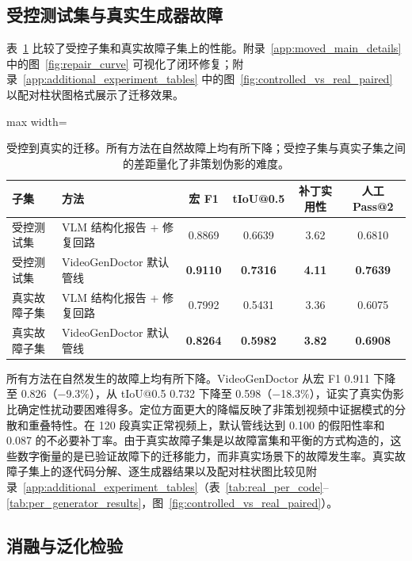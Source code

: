 \documentclass{article}
\begin{document}
\subsection{受控测试集与真实生成器故障}
\label{sec:real_failures}
表~\ref{tab:controlled_vs_real} 比较了受控子集和真实故障子集上的性能。附录~\ref{app:moved_main_details} 中的图~\ref{fig:repair_curve} 可视化了闭环修复；附录~\ref{app:additional_experiment_tables} 中的图~\ref{fig:controlled_vs_real_paired} 以配对柱状图格式展示了迁移效果。
\begin{table}[t]
\centering\small
\caption{受控到真实的迁移。所有方法在自然故障上均有所下降；受控子集与真实子集之间的差距量化了非策划伪影的难度。}
\label{tab:controlled_vs_real}
\begin{adjustbox}{max width=\textwidth}
\begin{tabular}{llcccc}
\toprule
\textbf{子集} & \textbf{方法} & \textbf{宏 F1} & \textbf{tIoU@0.5} & \textbf{补丁实用性} & \textbf{人工 Pass@2} \\
\midrule
受控测试集 & VLM 结构化报告 + 修复回路 & 0.8869 & 0.6639 & 3.62 & 0.6810 \\
受控测试集 & VideoGenDoctor 默认管线 & \textbf{0.9110} & \textbf{0.7316} & \textbf{4.11} & \textbf{0.7639} \\
真实故障子集 & VLM 结构化报告 + 修复回路 & 0.7992 & 0.5431 & 3.36 & 0.6075 \\
真实故障子集 & VideoGenDoctor 默认管线 & \textbf{0.8264} & \textbf{0.5982} & \textbf{3.82} & \textbf{0.6908} \\
\bottomrule
\end{tabular}
\end{adjustbox}
\end{table}

所有方法在自然发生的故障上均有所下降。VideoGenDoctor 从宏 F1 0.911 下降至 0.826（$-$9.3\%），从 tIoU@0.5 0.732 下降至 0.598（$-$18.3\%），证实了真实伪影比确定性扰动要困难得多。定位方面更大的降幅反映了非策划视频中证据模式的分散和重叠特性。在 120 段真实正常视频上，默认管线达到 0.100 的假阳性率和 0.087 的不必要补丁率。由于真实故障子集是以故障富集和平衡的方式构造的，这些数字衡量的是已验证故障下的迁移能力，而非真实场景下的故障发生率。真实故障子集上的逐代码分解、逐生成器结果以及配对柱状图比较见附录~\ref{app:additional_experiment_tables}（表~\ref{tab:real_per_code}--\ref{tab:per_generator_results}，图~\ref{fig:controlled_vs_real_paired}）。

\subsection{消融与泛化检验}
\label{sec:ablations}
\end{document}
